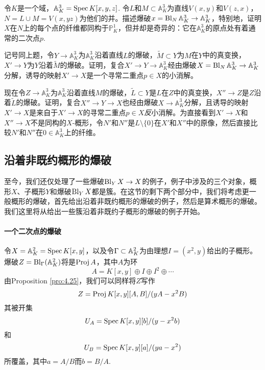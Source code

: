 \begin{exe}\label{exe:4.37}
	令$K$是一个域，$\mathbb A_K^3=\operatorname{Spec} K[x,y,z]$. 令$L$和$M\subset \mathbb A_K^3$为直线$V(x,y)$和$V(z,x)$，$N=L\cup M=V(x,yz)$为他们的并。描述爆破$x=\operatorname{Bl}_N \mathbb A_K^3\to \mathbb A_K^3$，特别地，证明$X$在$N$上的每个点的纤维都同构于$\mathbb P_K^1$，但并却是奇异的：它在$\mathbb A_K^3$的原点处有着通常的二次点$p$.
\end{exe}


\begin{exe}\label{exe:4.38}
	记号同上题，令$Y\to \mathbb A_K^3$为$\mathbb A_K^3$沿着直线$L$的爆破，$\tilde M\subset Y$为$M$在$Y$中的真变换，$X'\to Y$为$Y$沿着$\tilde M$的爆破。证明，复合$X'\to Y\to \mathbb A_K^3$经由爆破$X=\operatorname{Bl}_N \mathbb A_K^3\to \mathbb A_K^3$分解，诱导的映射$X'\to X$是一个寻常二重点$p\in X$的小消解。
\end{exe}

\begin{exe}\label{exe:4.39}
	现在令$Z\to \mathbb A_K^3$为$\mathbb A_K^3$沿着直线$M$的爆破，$\tilde{L}\subset Y$是$L$在$Z$中的真变换，$X''\to Z$是$Z$沿着$\tilde L$的爆破。证明，复合$X''\to Y\to X$也经由爆破$X\to \mathbb A_K^3$分解，且诱导的映射$X'\to X$是来自于$X'\to X$的寻常二重点$p\in X$\textit{反}小消解。为直接看到$X'\to X$和$X''\to X$不是同构的$X$-概形，令$N'$和$N''$是$L\setminus \{0\}$在$X'$和$X''$中的原像，然后直接比较$N'$和$N''$在$0\in \mathbb A_K^3$上的纤维。
\end{exe}

\subsection{沿着非既约概形的爆破}\label{s:4.2.3}

至今，我们还仅处理了一些爆破$\operatorname{Bl}_Y X\to X$的例子，例子中涉及的三个对象，概形$X$、子概形$Y$和爆破$\operatorname{Bl}_YX$都是簇。在这节的剩下两个部分中，我们将考虑更一般概形的爆破，首先给出沿着非既约概形的爆破的例子，然后是算术概形的爆破。我们这里将从给出一些簇沿着非既约子概形的爆破的例子开始。

\paragraph*{一个二次点的爆破} 
令$X=\mathbb{A}_K^2=\operatorname{Spec} K[x,y]$，以及令$\Gamma\subset \mathbb{A}_K^2$为由理想$I=(x^2,y)$给出的子概形。爆破$Z=\operatorname{Bl}_\Gamma(\mathbb{A}_K^2)$将是$\operatorname{Proj} A$，其中$A$为环
\[
	A=K[x,y]\oplus I\oplus I^2\oplus \cdots
\]
由Proposition \ref{pro:4.25}，我们可以同样将$Z$写作
\[
	Z=\operatorname{Proj} K[x,y][A,B]/(yA-x^2B)
\]
其被开集
\[
	U_A=\operatorname{Spec} K[x,y][b]/(y-x^2b)
\]
和
\[
	U_B=\operatorname{Spec} K[x,y][a]/(ya-x^2)
\]
所覆盖，其中$a=A/B$而$b=B/A$.


